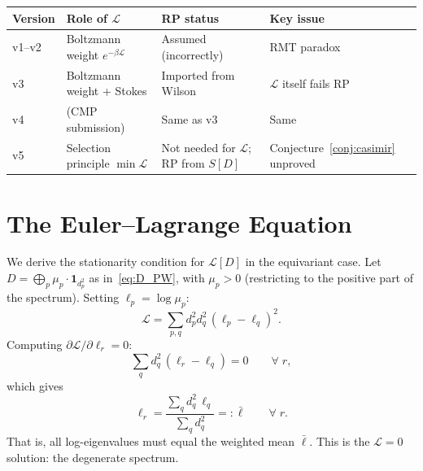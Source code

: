 \documentclass[12pt]{article}
\theoremstyle{definition}
\theoremstyle{remark}
\begin{document}
\begin{center}
\renewcommand{\arraystretch}{1.3}
\begin{tabular}{@{}p{2cm}p{4cm}p{4cm}p{3cm}@{}}
\toprule
\textbf{Version} & \textbf{Role of $\mathcal{L}$} &
\textbf{RP status} & \textbf{Key issue} \\
\midrule
v1--v2 & Boltzmann weight $e^{-\beta\mathcal{L}}$ &
  Assumed (incorrectly) & RMT paradox \\
v3 & Boltzmann weight + Stokes & Imported from Wilson &
  $\mathcal{L}$ itself fails RP \\
v4 & (CMP submission) & Same as v3 &
  Same \\
v5 & Selection principle $\min\mathcal{L}$ &
  Not needed for $\mathcal{L}$; RP from $S[D]$ &
  Conjecture~\ref{conj:casimir} unproved \\
\bottomrule
\end{tabular}
\end{center}

\section{The Euler--Lagrange Equation}
\label{sec:EL}

We derive the stationarity condition for $\mathcal{L}[D]$ in the
equivariant case.  Let $D = \bigoplus_p \mu_p \cdot \mathbf{1}_{d_p^2}$
as in~\eqref{eq:D_PW}, with $\mu_p > 0$ (restricting to the positive
part of the spectrum).  Setting $\ell_p = \log\mu_p$:
\begin{equation}\label{eq:L_ell}
  \mathcal{L}
  = \sum_{p,q} d_p^2 d_q^2\,(\ell_p - \ell_q)^2.
\end{equation}
Computing $\partial\mathcal{L}/\partial\ell_r = 0$:
\begin{equation}\label{eq:EL}
  \sum_{q} d_q^2\,(\ell_r - \ell_q) = 0
  \qquad \forall\; r,
\end{equation}
which gives
\begin{equation}\label{eq:EL_solution}
  \ell_r
  = \frac{\sum_q d_q^2\,\ell_q}{\sum_q d_q^2}
  =: \bar\ell
  \qquad \forall\; r.
\end{equation}
That is, all log-eigenvalues must equal the weighted mean $\bar\ell$.
This is the $\mathcal{L} = 0$ solution: the degenerate spectrum.
\end{document}

